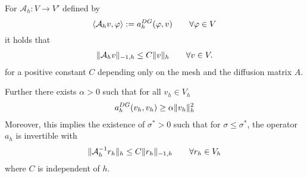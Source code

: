 \begin{theorem}[Stability]\label{thm: SIPG stability}
	For $\mathcal A_h:V \rightarrow V'$ defined by 
	\[
	 \langle \mathcal A_h v, \varphi \rangle := a_h^{DG}(\varphi, v) \qquad \forall \varphi \in V
	\]
	it holds that  
	\begin{align*}
	\HMinusOneDnorm{\mathcal A_h v} \leq C \eNorm v \qquad \forall v \in V. %
	\end{align*}
	for a positive constant $C$ depending only on the mesh and the diffusion matrix $A$. 
	
	Further there exists $\alpha > 0 $ such that for all $v_h \in V_h$
	\begin{align}
		a_h^{DG}(v_h, v_h) \geq \alpha \lVert v_h \rVert_{h}^2 \label{eq: coercivity DG form}
	\end{align}	
	Moreover, this implies the existence of $\sigma^* > 0$ such that for $\sigma \leq \sigma^* $, the operator $a_h$ is invertible with 
	\begin{align*}
	\eNorm {\mathcal A_h^{-1} {r_h}} \leq C \HMinusOneDnorm {r_h} \qquad \forall r_h \in V_h %
	\end{align*}
	where $C$ is independent of $h$. 
\end{theorem}

